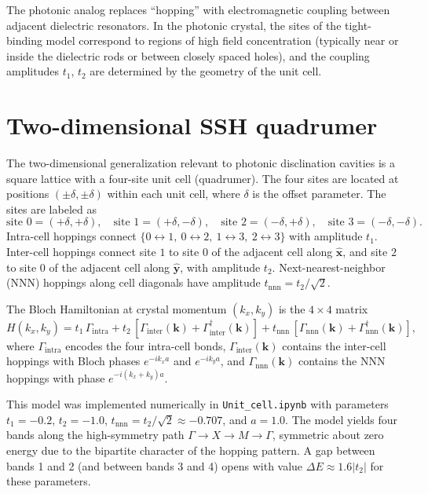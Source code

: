 \documentclass[12pt,a4paper,oneside]{book}
\theoremstyle{plain}
\theoremstyle{definition}
\theoremstyle{remark}
\newcommand{\vb}[1]{\bm{#1}}
\newcommand{\uv}[1]{\hat{\bm{#1}}}
\newcommand{\kvec}{\vb{k}}
\begin{document}
The photonic analog replaces ``hopping'' with electromagnetic coupling between adjacent dielectric resonators. In the photonic crystal, the sites of the tight-binding model correspond to regions of high field concentration (typically near or inside the dielectric rods or between closely spaced holes), and the coupling amplitudes $t_1$, $t_2$ are determined by the geometry of the unit cell.

\section{Two-dimensional SSH quadrumer}
\label{sec:ssh-2d}

The two-dimensional generalization relevant to photonic disclination cavities is a square lattice with a four-site unit cell (quadrumer). The four sites are located at positions $(\pm\delta, \pm\delta)$ within each unit cell, where $\delta$ is the offset parameter. The sites are labeled as
\begin{equation}
  \text{site } 0 = (+\delta,+\delta), \quad
  \text{site } 1 = (+\delta,-\delta), \quad
  \text{site } 2 = (-\delta,+\delta), \quad
  \text{site } 3 = (-\delta,-\delta).
\end{equation}
Intra-cell hoppings connect $\{0\leftrightarrow 1,\ 0\leftrightarrow 2,\ 1\leftrightarrow 3,\ 2\leftrightarrow 3\}$ with amplitude $t_1$. Inter-cell hoppings connect site $1$ to site $0$ of the adjacent cell along $\uv{x}$, and site $2$ to site $0$ of the adjacent cell along $\uv{y}$, with amplitude $t_2$. Next-nearest-neighbor (NNN) hoppings along cell diagonals have amplitude $t_\mathrm{nnn} = t_2/\sqrt{2}$.

The Bloch Hamiltonian at crystal momentum $(k_x, k_y)$ is the $4\times4$ matrix
\begin{equation}
  H(k_x,k_y) = t_1\,\Gamma_\mathrm{intra} + t_2\,[\Gamma_\mathrm{inter}(\kvec) + \Gamma_\mathrm{inter}^\dagger(\kvec)] + t_\mathrm{nnn}\,[\Gamma_\mathrm{nnn}(\kvec) + \Gamma_\mathrm{nnn}^\dagger(\kvec)],
  \label{eq:H-2d-ssh}
\end{equation}
where $\Gamma_\mathrm{intra}$ encodes the four intra-cell bonds, $\Gamma_\mathrm{inter}(\kvec)$ contains the inter-cell hoppings with Bloch phases $e^{-ik_xa}$ and $e^{-ik_ya}$, and $\Gamma_\mathrm{nnn}(\kvec)$ contains the NNN hoppings with phase $e^{-i(k_x+k_y)a}$.

This model was implemented numerically in \texttt{Unit\_cell.ipynb} with parameters $t_1 = -0.2$, $t_2 = -1.0$, $t_\mathrm{nnn} = t_2/\sqrt{2} \approx -0.707$, and $a = 1.0$. The model yields four bands along the high-symmetry path $\Gamma \to X \to M \to \Gamma$, symmetric about zero energy due to the bipartite character of the hopping pattern. A gap between bands 1 and 2 (and between bands 3 and 4) opens with value $\Delta E \approx 1.6|t_2|$ for these parameters.
\end{document}
